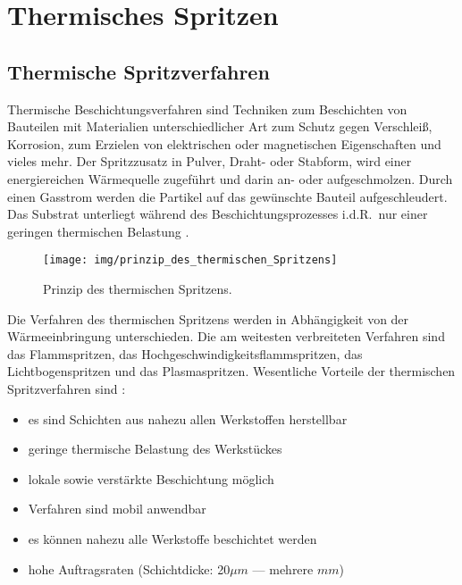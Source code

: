\documentclass[12pt,a4paper,bibliography=totocnumbered,listof=totocnumbered,fleqn]{scrartcl}
\begin{document}
\pagebreak
\section{Thermisches Spritzen}
\label{sec:thermspritzen}

\subsection{Thermische Spritzverfahren}

Thermische Beschichtungsverfahren sind Techniken zum Beschichten von Bauteilen mit Materialien unterschiedlicher Art zum Schutz gegen Verschleiß, Korrosion, zum Erzielen von elektrischen oder magnetischen Eigenschaften und vieles mehr. Der Spritzzusatz in Pulver, Draht- oder Stabform, wird einer energiereichen Wärmequelle zugeführt und darin an- oder aufgeschmolzen. Durch einen Gasstrom werden die Partikel auf das gewünschte Bauteil aufgeschleudert. Das Substrat unterliegt während des Beschichtungsprozesses i.d.R.\ nur einer geringen thermischen Belastung \citep{bach2005moderne}.

\begin{figure}[h]
\centering
\texttt{[image: img/prinzip\_des\_thermischen\_Spritzens]}
\caption{Prinzip des thermischen Spritzens.}
\label{fig:thermischspritzen}
\end{figure}

Die Verfahren des thermischen Spritzens werden in Abhängigkeit von der Wärmeeinbringung unterschieden.
Die am weitesten verbreiteten Verfahren sind das Flammspritzen, das Hochgeschwindigkeitsflammspritzen, das Lichtbogenspritzen und das Plasmaspritzen.
Wesentliche Vorteile der thermischen Spritzverfahren sind \citep{bach2005moderne}:

\begin{itemize}
	\item es sind Schichten aus nahezu allen Werkstoffen herstellbar
	\item geringe thermische Belastung des Werkstückes
	\item lokale sowie verstärkte Beschichtung möglich
	\item Verfahren sind mobil anwendbar
	\item es können nahezu alle Werkstoffe beschichtet werden
	\item hohe Auftragsraten (Schichtdicke: 20$\mu m$ --- mehrere $mm$)
\end{itemize}
\end{document}
